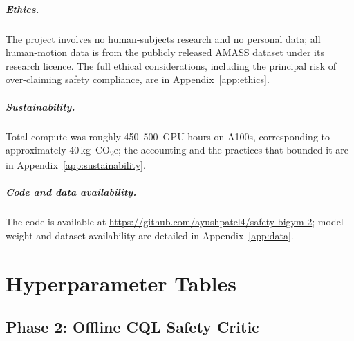 \documentclass[11pt,a4paper]{report}
\begin{document}
\paragraph{Ethics.}
The project involves no human-subjects research and no personal
data; all human-motion data is from the publicly released AMASS
dataset under its research licence. The full ethical considerations,
including the principal risk of over-claiming safety compliance, are
in Appendix~\ref{app:ethics}.

\paragraph{Sustainability.}
Total compute was roughly 450--500~GPU-hours on A100s,
corresponding to approximately 40\,kg~CO\textsubscript{2}e; the
accounting and the practices that bounded it are in
Appendix~\ref{app:sustainability}.

\paragraph{Code and data availability.}
The code is available at
\url{https://github.com/ayushpatel4/safety-bigym-2}; model-weight and
dataset availability are detailed in Appendix~\ref{app:data}.

\clearpage
{}
{}


\appendix

\chapter{Hyperparameter Tables}
\label{app:hparams}

\section{Phase 2: Offline CQL Safety Critic}
\label{app:hparams:svf}
\end{document}
